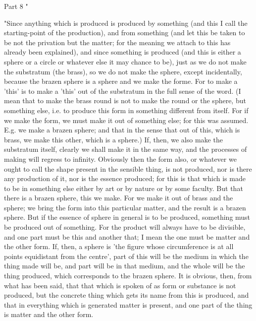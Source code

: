 Part 8 "

"Since anything which is produced is produced by something (and this
I call the starting-point of the production), and from something (and
let this be taken to be not the privation but the matter; for the
meaning we attach to this has already been explained), and since something
is produced (and this is either a sphere or a circle or whatever else
it may chance to be), just as we do not make the substratum (the brass),
so we do not make the sphere, except incidentally, because the brazen
sphere is a sphere and we make the forme. For to make a 'this' is
to make a 'this' out of the substratum in the full sense of the word.
(I mean that to make the brass round is not to make the round or the
sphere, but something else, i.e. to produce this form in something
different from itself. For if we make the form, we must make it out
of something else; for this was assumed. E.g. we make a brazen sphere;
and that in the sense that out of this, which is brass, we make this
other, which is a sphere.) If, then, we also make the substratum itself,
clearly we shall make it in the same way, and the processes of making
will regress to infinity. Obviously then the form also, or whatever
we ought to call the shape present in the sensible thing, is not produced,
nor is there any production of it, nor is the essence produced; for
this is that which is made to be in something else either by art or
by nature or by some faculty. But that there is a brazen sphere, this
we make. For we make it out of brass and the sphere; we bring the
form into this particular matter, and the result is a brazen sphere.
But if the essence of sphere in general is to be produced, something
must be produced out of something. For the product will always have
to be divisible, and one part must be this and another that; I mean
the one must be matter and the other form. If, then, a sphere is 'the
figure whose circumference is at all points equidistant from the centre',
part of this will be the medium in which the thing made will be, and
part will be in that medium, and the whole will be the thing produced,
which corresponds to the brazen sphere. It is obvious, then, from
what has been said, that that which is spoken of as form or substance
is not produced, but the concrete thing which gets its name from this
is produced, and that in everything which is generated matter is present,
and one part of the thing is matter and the other form. 

